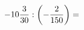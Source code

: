 \documentclass[preview]{standalone}
\begin{document}
\begin{align*}
-10 { 3 \over 30 }  :  \left( - { 2 \over 150 } \right)  =
\end{align*}
\end{document}
